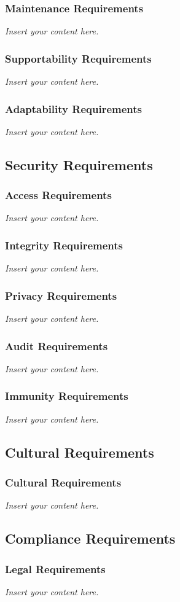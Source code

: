 \documentclass[12pt]{article}
\newcommand{\lips}{\textit{Insert your content here.}}
\begin{document}
\subsubsection{Maintenance Requirements}
\lips
\subsubsection{Supportability Requirements}
\lips
\subsubsection{Adaptability Requirements}
\lips

\subsection{Security Requirements}
\subsubsection{Access Requirements}
\lips
\subsubsection{Integrity Requirements}
\lips
\subsubsection{Privacy Requirements}
\lips
\subsubsection{Audit Requirements}
\lips
\subsubsection{Immunity Requirements}
\lips

\subsection{Cultural Requirements}
\subsubsection{Cultural Requirements}
\lips

\subsection{Compliance Requirements}
\subsubsection{Legal Requirements}
\lips
\end{document}
